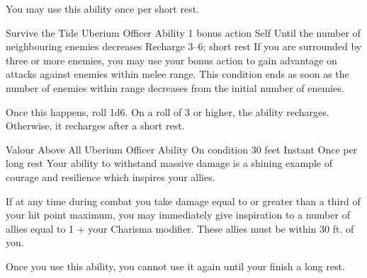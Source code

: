 You may use this ability once per short rest.


\ability%
    {Survive the Tide}
    {Uberium Officer Ability}
    {1 bonus action}
    {Self}
    {Until the number of neighbouring enemies decreases}
    {Recharge 3--6; short rest}
If you are surrounded by three or more enemies,
you may use your bonus action to gain advantage on attacks
against enemies within melee range.
This condition ends as soon as the number of enemies
within range decreases from the initial number of enemies.

Once this happens, roll 1d6.
On a roll of 3 or higher, 
the ability recharges.
Otherwise, it recharges after a short rest.


\ability%
    {Valour Above All}
    {Uberium Officer Ability}
    {On condition}
    {30 feet}
    {Instant}
    {Once per long rest}
Your ability to withstand massive damage
is a shining example of courage and resilience
which inspires your allies.

If at any time during combat you take damage
equal to or greater than a third of your hit point maximum,
you may immediately give inspiration to a number of allies
equal to 1 + your Charisma modifier.
These allies must be within 30 ft. of you.

Once you use this ability,
you cannot use it again until your finish a long rest.


